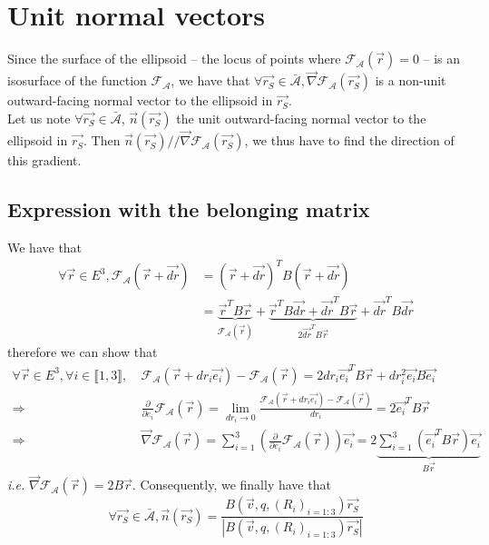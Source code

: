 \documentclass[class=report, float=false, crop=false]{standalone}
\begin{document}
\section{Unit normal vectors}

Since the surface of the ellipsoid -- the locus of points where $\mathcal{F}_{\mathcal{A}}(\vec{r}) = 0$ -- is an isosurface of the function $\mathcal{F}_{\mathcal{A}}$, we have that $\forall \vec{r_S} \in \bar{\mathcal{A}}, \vec{\nabla}\mathcal{F}_{\mathcal{A}}(\vec{r_S})$ is a non-unit outward-facing normal vector to the ellipsoid in $\vec{r_S}$.\\

Let us note $\forall \vec{r_S} \in \bar{\mathcal{A}}$, $\vec{n}(\vec{r_S})$ the unit outward-facing normal vector to the ellipsoid in $\vec{r_S}$. Then $\vec{n}(\vec{r_S}) // \vec{\nabla}\mathcal{F}_{\mathcal{A}}(\vec{r_S})$, we thus have to find the direction of this gradient.

\subsection{Expression with the belonging matrix}
\label{normal_vector_belonging}

We have that
\begin{align*}
\forall \vec{r} \in E^3, \mathcal{F}_{\mathcal{A}}(\vec{r} + \vec{dr}) &= (\vec{r} + \vec{dr})^TB(\vec{r} + \vec{dr})\\
&= \underbrace{\vec{r}^TB\vec{r}}_{\mathcal{F}_{\mathcal{A}}(\vec{r})} + \underbrace{\vec{r}^TB\vec{dr} + \vec{dr}^TB\vec{r}}_{2\vec{dr}^TB\vec{r}} + \vec{dr}^TB\vec{dr}
\end{align*}
therefore we can show that
\begin{align*}
\forall \vec{r} \in E^3, \forall i \in \llbracket1,3\rrbracket,~ &\mathcal{F}_{\mathcal{A}}(\vec{r} + dr_i\vec{e_i}) - \mathcal{F}_{\mathcal{A}}(\vec{r}) = 2dr_i\vec{e_i}^TB\vec{r} + dr_i^2\vec{e_i}B\vec{e_i}\\
\Rightarrow&\frac{\partial}{\partial e_i}\mathcal{F}_{\mathcal{A}}(\vec{r}) = \lim_{dr_i \to 0} \frac{\mathcal{F}_{\mathcal{A}}(\vec{r} + dr_i\vec{e_i}) - \mathcal{F}_{\mathcal{A}}(\vec{r})}{dr_i} = 2\vec{e_i}^TB\vec{r}\\
\Rightarrow&\vec{\nabla}\mathcal{F}_{\mathcal{A}}(\vec{r}) = \sum_{i=1}^3\left(\frac{\partial}{\partial e_i}\mathcal{F}_{\mathcal{A}}(\vec{r})\right)\vec{e_i} = 2\underbrace{\sum_{i=1}^3(\vec{e_i}^TB\vec{r})\vec{e_i}}_{B\vec{r}}
\end{align*}
\textit{i.e.} $\vec{\nabla}\mathcal{F}_{\mathcal{A}}(\vec{r}) = 2B\vec{r}$. Consequently, we finally have that
\begin{equation}
\boxed{\forall \vec{r_S}\in \bar{\mathcal{A}}, \vec{n}(\vec{r_S}) = \frac{B(\vec{v},q,(R_i)_{i=1:3})\vec{r_S}}{|B(\vec{v},q,(R_i)_{i=1:3})\vec{r_S}|}}
\end{equation}
\end{document}
